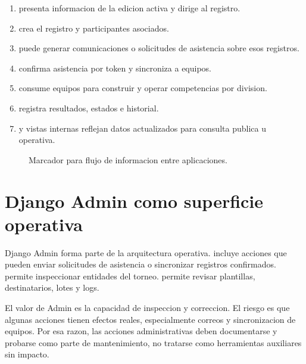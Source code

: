 \begin{enumerate}
  \item {} presenta informacion de la edicion activa y dirige al registro.
  \item {} crea el registro y participantes asociados.
  \item {} puede generar comunicaciones o solicitudes de asistencia sobre esos registros.
  \item {} confirma asistencia por token y sincroniza a equipos.
  \item {} consume equipos para construir y operar competencias por division.
  \item {} registra resultados, estados e historial.
  \item {} y vistas internas reflejan datos actualizados para consulta publica u operativa.
\end{enumerate}

\begin{figure}[H]
  \centering
  \caption{Marcador para flujo de informacion entre aplicaciones.}
  \label{fig:apps-flujo-informacion}
\end{figure}

\section{Django Admin como superficie operativa}
\label{sec:apps-admin}

Django Admin forma parte de la arquitectura operativa.  incluye acciones que pueden enviar solicitudes de asistencia o sincronizar registros confirmados.  permite inspeccionar entidades del torneo.  permite revisar plantillas, destinatarios, lotes y logs.

El valor de Admin es la capacidad de inspeccion y correccion. El riesgo es que algunas acciones tienen efectos reales, especialmente correos y sincronizacion de equipos. Por esa razon, las acciones administrativas deben documentarse y probarse como parte de mantenimiento, no tratarse como herramientas auxiliares sin impacto.

